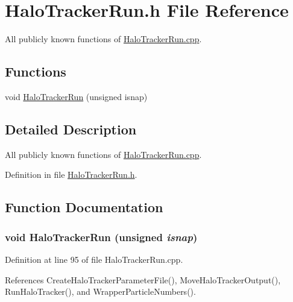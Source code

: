 \section{HaloTrackerRun.h File Reference}
\label{HaloTrackerRun_8h}


All publicly known functions of \hyperlink{HaloTrackerRun_8cpp}{HaloTrackerRun.cpp}.  


\subsection*{Functions}
\begin{DoxyCompactItemize}
\item 
void \hyperlink{HaloTrackerRun_8h_a9cb4854254f44c5f21198856836ba77c}{HaloTrackerRun} (unsigned isnap)
\end{DoxyCompactItemize}


\subsection{Detailed Description}
All publicly known functions of \hyperlink{HaloTrackerRun_8cpp}{HaloTrackerRun.cpp}. 

Definition in file \hyperlink{HaloTrackerRun_8h_source}{HaloTrackerRun.h}.



\subsection{Function Documentation}
\subsubsection[{HaloTrackerRun}]{\setlength{\rightskip}{0pt plus 5cm}void HaloTrackerRun (unsigned {\em isnap})}\label{HaloTrackerRun_8h_a9cb4854254f44c5f21198856836ba77c}


Definition at line 95 of file HaloTrackerRun.cpp.



References CreateHaloTrackerParameterFile(), MoveHaloTrackerOutput(), RunHaloTracker(), and WrapperParticleNumbers().

